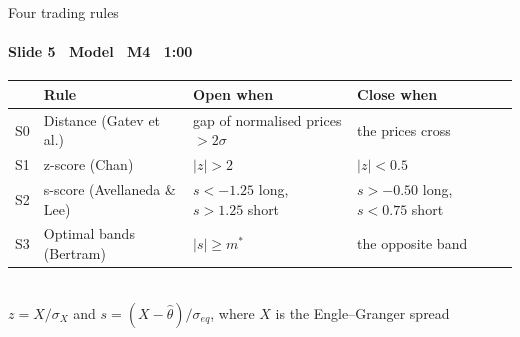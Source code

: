 \begin{frame}{Four trading rules}
\framesubtitle{Slide 5 \textbullet\ Model \textbullet\ M4 \textbullet\ 1:00}
\vspace{-2pt}
\small\setlength{\tabcolsep}{4pt}
\begin{tabular}{@{}l@{\ \ }p{3.5cm}p{4.9cm}p{4.2cm}@{}}
  \toprule
  & Rule & Open when & Close when \\
  \midrule
  S0 & Distance (Gatev et al.) & gap of normalised prices $>2\sigma$ & the prices cross \\
  S1 & z-score (Chan) & $|z|>2$ & $|z|<0.5$ \\
  S2 & s-score (Avellaneda \& Lee) & $s<-1.25$ long, $s>1.25$ short & $s>-0.50$ long, $s<0.75$ short \\
  S3 & Optimal bands (Bertram) & $|s|\ge m^*$ & the opposite band \\
  \bottomrule
\end{tabular}\\[5pt]
{\footnotesize $z=X/\sigma_X$ and $s=(X-\hat\theta)/\sigma_{eq}$, where $X$ is the Engle--Granger spread}
\end{frame}
